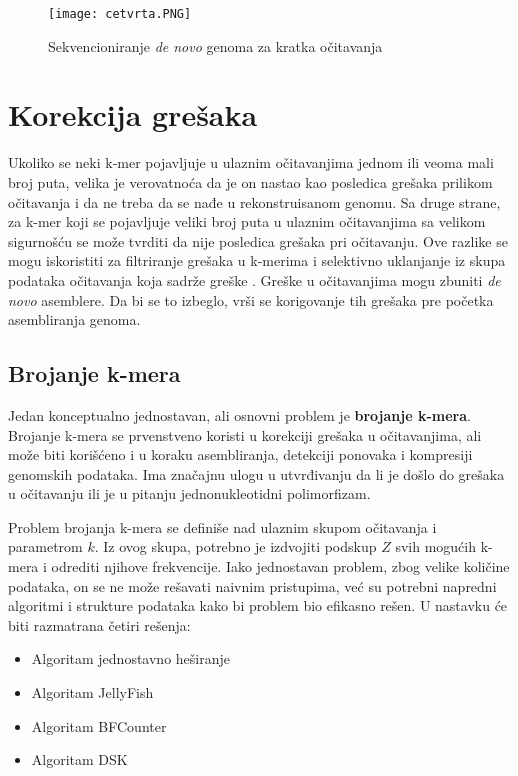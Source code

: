 \documentclass[12pt,oneside]{memoir}
\begin{document}
\begin{figure}[!ht]
  \centering
  \texttt{[image: cetvrta.PNG]}
  \caption{Sekvencioniranje \textit{de novo} genoma za kratka očitavanja \cite{WingKinSung}}
  \label{fig:4}
\end{figure}

\section{Korekcija grešaka}
\label{poglavlje:korekcijaGresaka}

Ukoliko se neki k-mer pojavljuje u ulaznim očitavanjima jednom ili veoma mali broj puta, velika je verovatnoća da je on nastao kao posledica grešaka prilikom očitavanja i da ne treba da se nađe u rekonstruisanom genomu. Sa druge strane, za k-mer koji se pojavljuje veliki broj puta u ulaznim očitavanjima sa velikom sigurnošću se može tvrditi da nije posledica grešaka pri očitavanju. Ove razlike se mogu iskoristiti za filtriranje grešaka u k-merima i selektivno uklanjanje iz skupa podataka očitavanja koja sadrže greške \cite{WingKinSung}. 
Greške u očitavanjima mogu zbuniti \textit{de novo} asemblere. Da bi se to izbeglo, vrši se korigovanje tih grešaka pre početka asembliranja genoma.

\subsection{Brojanje k-mera}

Jedan konceptualno jednostavan, ali osnovni problem je \textbf{brojanje k-mera}. Brojanje k-mera se prvenstveno koristi u korekciji grešaka u očitavanjima, ali može biti korišćeno i u koraku asembliranja, detekciji ponovaka i kompresiji genomskih podataka. Ima značajnu ulogu u utvrđivanju da li je došlo do grešaka u očitavanju ili je u pitanju jednonukleotidni polimorfizam. 

Problem brojanja k-mera se definiše nad ulaznim skupom očitavanja i parametrom $k$. Iz ovog skupa, potrebno je izdvojiti podskup $Z$ svih mogućih k-mera i odrediti njihove frekvencije. Iako jednostavan problem, zbog velike količine podataka, on se ne može rešavati naivnim pristupima, već su potrebni napredni algoritmi i strukture podataka kako bi problem bio efikasno rešen. U nastavku će biti razmatrana četiri rešenja:
\begin{itemize}
\itemsep0em
    \item {Algoritam jednostavno heširanje}
    \item {Algoritam JellyFish}
    \item {Algoritam BFCounter}
    \item {Algoritam DSK}
\end{itemize}
\end{document}
